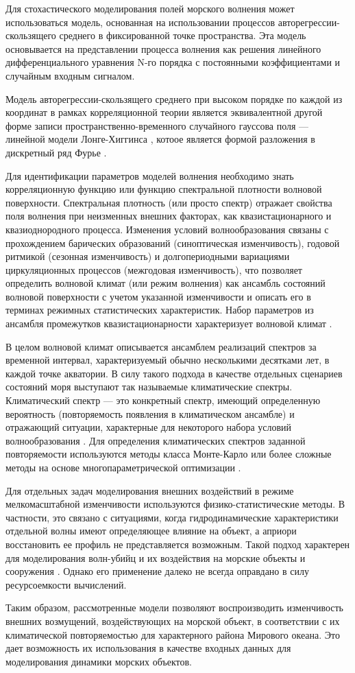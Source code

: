 Для стохастического моделирования полей морского волнения может использоваться модель, основанная на использовании процессов авторегрессии-скользящего среднего \citep{p295I_31} в фиксированной точке пространства. Эта модель основывается на представлении процесса волнения как решения линейного дифференциального уравнения N-го порядка с постоянными коэффициентами и случайным входным сигналом.

Модель авто\-регрессии-скользящего среднего при высоком порядке по каждой из координат в рамках корреляционной теории является эквивалентной другой форме записи пространственно-временного случайного гауссова поля --- линейной модели Лонге-Хиггинса \citep{p295I_45}, котоое является формой разложения в дискретный ряд Фурье \citep{krogstad89}.

Для идентификации параметров моделей волнения необходимо знать корреляционную функцию или функцию спектральной плотности волновой поверхности. Спектральная плотность (или просто спектр) отражает свойства поля волнения при неизменных внешних факторах, как квазистационарного и квазиоднородного процесса. Изменения условий волнообразования связаны с прохождением барических образований (синоптическая изменчивость), годовой ритмикой (сезонная изменчивость) и долгопериодными вариациями циркуляционных процессов (межгодовая изменчивость), что позволяет определить волновой климат (или режим волнения) как ансамбль состояний волновой поверхности с учетом указанной изменчивости и описать его в терминах режимных статистических характеристик. Набор параметров из ансамбля промежутков квазистационарности характеризует волновой климат \citep{dk4}.

В целом волновой климат описывается ансамблем реализаций спектров за временной интервал, характеризуемый обычно несколькими десятками лет, в каждой точке  акватории. В силу такого подхода в качестве отдельных сценариев состояний моря выступают так называемые климатические спектры. Климатический спектр — это конкретный спектр, имеющий определенную вероятность (повторяемость появления в климатическом ансамбле) и отражающий ситуации, характерные для некоторого набора условий волнообразования \citep{dk4}. Для определения климатических спектров заданной повторяемости используются методы класса Монте-Карло \citep{dk8} или более сложные методы на основе многопараметрической оптимизации  \citep{dk5}.

Для отдельных задач моделирования внешних воздействий в режиме мелкомасштабной изменчивости используются физико-статистические методы. В частности, это связано с ситуациями, когда гидродинамические характеристики отдельной волны имеют определяющее влияние на объект, а априори восстановить ее профиль не представляется возможным. Такой подход характерен для моделирования волн-убийц и их воздействия на морские объекты и сооружения \citep{dk12}\citep{dk13}. Однако его применение далеко не всегда оправдано в силу ресурсоемкости вычислений.

Таким образом, рассмотренные модели позволяют воспроизводить изменчивость внешних возмущений, воздействующих на морской объект, в соответствии с их климатической повторяемостью для характерного района Мирового океана. Это дает возможность их использования в качестве входных данных для моделирования динамики морских объектов.